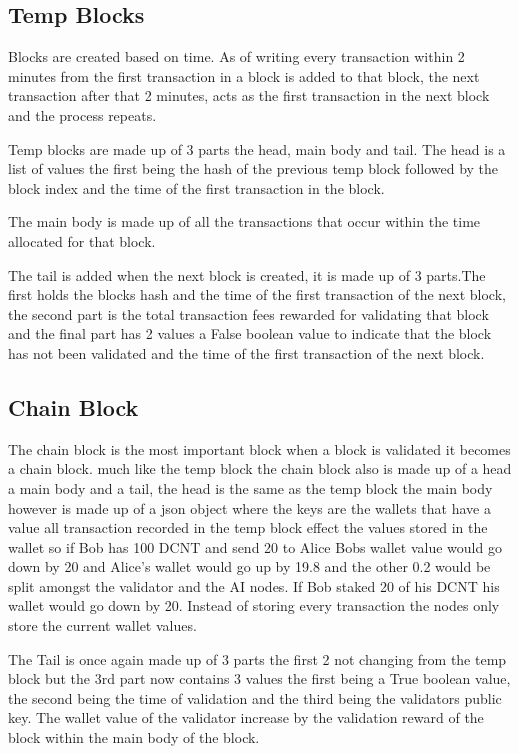 \documentclass[11pt]{extarticle}
\begin{document}
\subsection{Temp Blocks}
Blocks are created based on time. As of writing every transaction within 2 minutes from the first transaction in a block is added to that block, the next transaction after that 2 minutes, acts as the first transaction in the next block and the process repeats. 

Temp blocks are made up of 3 parts the head, main body and tail. The head is a list of values the first being the hash of the previous temp block followed by the block index and the time of the first transaction in the block. 

The main body is made up of all the transactions that occur within the time allocated for that block.

 The tail is added when the next block is created, it is made up of 3 parts.The first holds the blocks hash and the time of the first transaction of the next block, the second part is the total transaction fees rewarded for validating that block and the final part has 2 values a False boolean value to indicate that the block has not been validated and the time of the first transaction of the next block.

\subsection{Chain Block}
The chain block is the most important block when a block is validated it becomes a chain block. much like the temp block the chain block also is made up of a head a main body and a tail, the head is the same as the temp block the main body however is made up of a json object where the keys are the wallets that have a value all transaction recorded in the temp block effect the values stored in the wallet so if Bob has 100 DCNT and send 20 to Alice Bobs wallet value would go down by 20 and Alice's wallet would go up by 19.8 and the other 0.2 would be split amongst the validator and the AI nodes. If Bob staked 20 of his DCNT his wallet would go down by 20. Instead of storing every transaction the nodes only store the current wallet values. 

The Tail is once again made up of 3 parts the first 2 not changing from the temp block but the 3rd part now contains 3 values the first being a True boolean value, the second being the time of validation and the third being the validators public key. The wallet value of the validator increase by the validation reward of the block within the main body of the block.
\end{document}
